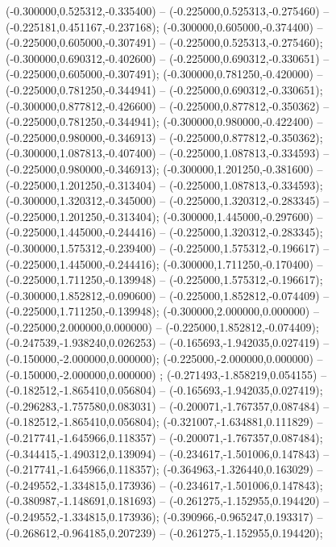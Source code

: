  (-0.300000,0.525312,-0.335400) -- (-0.225000,0.525313,-0.275460) -- (-0.225181,0.451167,-0.237168);
 (-0.300000,0.605000,-0.374400) -- (-0.225000,0.605000,-0.307491) -- (-0.225000,0.525313,-0.275460);
 (-0.300000,0.690312,-0.402600) -- (-0.225000,0.690312,-0.330651) -- (-0.225000,0.605000,-0.307491);
 (-0.300000,0.781250,-0.420000) -- (-0.225000,0.781250,-0.344941) -- (-0.225000,0.690312,-0.330651);
 (-0.300000,0.877812,-0.426600) -- (-0.225000,0.877812,-0.350362) -- (-0.225000,0.781250,-0.344941);
 (-0.300000,0.980000,-0.422400) -- (-0.225000,0.980000,-0.346913) -- (-0.225000,0.877812,-0.350362);
 (-0.300000,1.087813,-0.407400) -- (-0.225000,1.087813,-0.334593) -- (-0.225000,0.980000,-0.346913);
 (-0.300000,1.201250,-0.381600) -- (-0.225000,1.201250,-0.313404) -- (-0.225000,1.087813,-0.334593);
 (-0.300000,1.320312,-0.345000) -- (-0.225000,1.320312,-0.283345) -- (-0.225000,1.201250,-0.313404);
 (-0.300000,1.445000,-0.297600) -- (-0.225000,1.445000,-0.244416) -- (-0.225000,1.320312,-0.283345);
 (-0.300000,1.575312,-0.239400) -- (-0.225000,1.575312,-0.196617) -- (-0.225000,1.445000,-0.244416);
 (-0.300000,1.711250,-0.170400) -- (-0.225000,1.711250,-0.139948) -- (-0.225000,1.575312,-0.196617);
 (-0.300000,1.852812,-0.090600) -- (-0.225000,1.852812,-0.074409) -- (-0.225000,1.711250,-0.139948);
 (-0.300000,2.000000,0.000000) -- (-0.225000,2.000000,0.000000) -- (-0.225000,1.852812,-0.074409);
 (-0.247539,-1.938240,0.026253) -- (-0.165693,-1.942035,0.027419) -- (-0.150000,-2.000000,0.000000);
 (-0.225000,-2.000000,0.000000) -- (-0.150000,-2.000000,0.000000) ;
 (-0.271493,-1.858219,0.054155) -- (-0.182512,-1.865410,0.056804) -- (-0.165693,-1.942035,0.027419);
 (-0.296283,-1.757580,0.083031) -- (-0.200071,-1.767357,0.087484) -- (-0.182512,-1.865410,0.056804);
 (-0.321007,-1.634881,0.111829) -- (-0.217741,-1.645966,0.118357) -- (-0.200071,-1.767357,0.087484);
 (-0.344415,-1.490312,0.139094) -- (-0.234617,-1.501006,0.147843) -- (-0.217741,-1.645966,0.118357);
 (-0.364963,-1.326440,0.163029) -- (-0.249552,-1.334815,0.173936) -- (-0.234617,-1.501006,0.147843);
 (-0.380987,-1.148691,0.181693) -- (-0.261275,-1.152955,0.194420) -- (-0.249552,-1.334815,0.173936);
 (-0.390966,-0.965247,0.193317) -- (-0.268612,-0.964185,0.207239) -- (-0.261275,-1.152955,0.194420);
